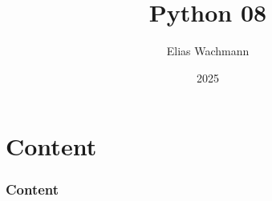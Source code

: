 \documentclass{beamer}
\title[]
{Python 08}
\author[E.~Wachmann]{\scriptsize Elias Wachmann
}
\date{2025} %
\institute[Institute of Theoretical and Computational Physics]
{
}
\begin{document}
\titleframe


\section*{Content}

\begin{frame}
\frametitle{Content}
  \tableofcontents
\end{frame}

\end{document}
